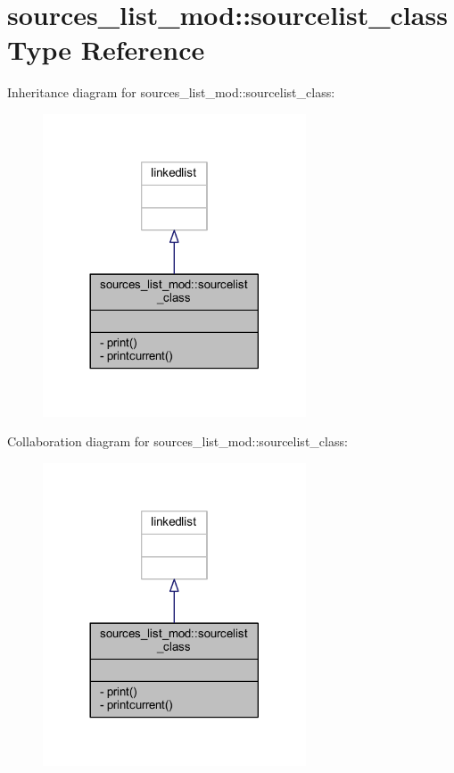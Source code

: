 \hypertarget{structsources__list__mod_1_1sourcelist__class}{}\section{sources\+\_\+list\+\_\+mod\+:\+:sourcelist\+\_\+class Type Reference}
\label{structsources__list__mod_1_1sourcelist__class}


Inheritance diagram for sources\+\_\+list\+\_\+mod\+:\+:sourcelist\+\_\+class\+:
\nopagebreak
\begin{figure}[H]
\begin{center}
\leavevmode
\includegraphics[width=221pt]{structsources__list__mod_1_1sourcelist__class__inherit__graph}
\end{center}
\end{figure}


Collaboration diagram for sources\+\_\+list\+\_\+mod\+:\+:sourcelist\+\_\+class\+:
\nopagebreak
\begin{figure}[H]
\begin{center}
\leavevmode
\includegraphics[width=221pt]{structsources__list__mod_1_1sourcelist__class__coll__graph}
\end{center}
\end{figure}
